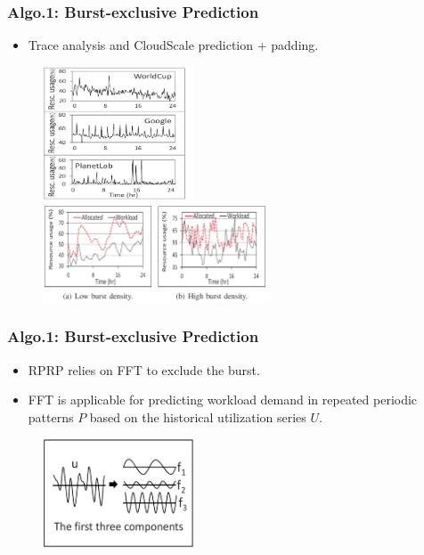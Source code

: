 \documentclass{beamer}
\begin{document}
	\begin{frame}
	\frametitle{Algo.1: Burst-exclusive Prediction}
		\begin{itemize}
		\item Trace analysis and CloudScale prediction $+$ padding.
		\end{itemize}
		\begin{figure}[h!]
		\centering
		\includegraphics[width=0.4\textwidth]{./figure/alg1_1.PNG}
		\includegraphics[width=0.6\textwidth]{./figure/alg1_2.PNG}
		\end{figure}
	\end{frame}

	\begin{frame}
	\frametitle{Algo.1: Burst-exclusive Prediction}
		\begin{itemize}
		\item RPRP relies on FFT to exclude the burst.
		\item FFT is applicable for predicting workload demand in repeated periodic patterns $P$ based on the historical utilization series $U$.
		\end{itemize}
		\begin{figure}[h!]
		\centering
		\includegraphics[width=0.4\textwidth]{./figure/alg1_3.PNG}
		\end{figure}
	\end{frame}
\end{document}
